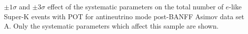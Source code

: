 \begin{table}	
	\begin{adjustbox}{width=\textwidth, totalheight=\textheight, keepaspectratio}
		
	\end{adjustbox}
	\caption
	{
		$\pm1\sigma$ and $\pm3\sigma$ effect of the systematic parameters on the total number of $e$-like Super-K events with \RunPeriod POT for antineutrino mode post-BANFF Asimov data set A. Only the systematic parameters which affect this sample are shown.
	}
\end{table}\clearpage